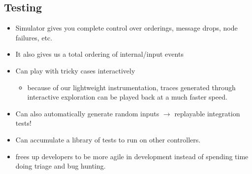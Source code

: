 \subsection{Testing}
%
\begin{itemize}
\item Simulator gives you complete control over orderings, message drops, node failures, etc.
\item It also gives us a total ordering of internal/input events
\item Can play with tricky cases interactively
  \begin{itemize}
  \item because of our lightweight instrumentation, traces generated through interactive exploration can be played back at a much faster speed.
  \end{itemize}
\item Can also automatically generate random inputs $\rightarrow$ replayable integration tests!
\item Can accumulate a library of tests to run on other controllers.
\item frees up developers to be more agile in development instead of spending time doing triage and bug hunting.
\end{itemize}

%


